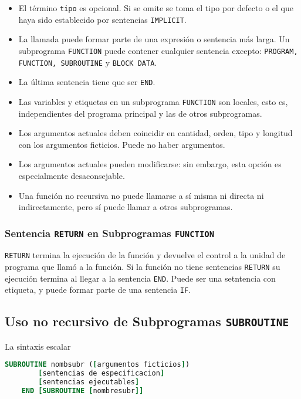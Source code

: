 \begin{itemize}
	\item El término {\tt tipo} es opcional. Si se omite se toma el tipo por defecto o el que haya sido establecido por sentencias {\tt IMPLICIT}. 
	\item La llamada puede formar parte de una expresión o sentencia más larga. Un subprograma {\tt FUNCTION} puede contener cualquier sentencia excepto: {\tt PROGRAM, FUNCTION, SUBROUTINE} y {\tt BLOCK DATA}.
	\item La última sentencia tiene que ser {\tt END}. 
	\item Las variables y etiquetas en un subprograma {\tt FUNCTION} son locales, esto es, independientes del programa principal y las de otros subprogramas. 
	\item Los argumentos actuales deben coincidir en cantidad, orden, tipo y longitud con los argumentos ficticios. Puede no haber argumentos.
	\item Los argumentos actuales pueden modificarse: sin embargo, esta opción es especialmente desaconsejable. 
	\item Una función no recursiva no puede llamarse a sí misma ni directa ni indirectamente, pero sí puede llamar a otros subprogramas.
\end{itemize}

\subsubsection{Sentencia {\tt RETURN} en Subprogramas {\tt FUNCTION}}

{\tt RETURN} termina la ejecución de la función y devuelve el control a la unidad de programa que llamó a la función. Si la función no tiene sentencias {\tt RETURN} su ejecución termina al llegar a la sentencia {\tt END}. Puede ser una setntencia con etiqueta, y puede formar parte de una sentencia {\tt IF}.

\subsection{Uso no recursivo de Subprogramas {\tt SUBROUTINE}}

La sintaxis escalar

\begin{lstlisting}[language=Fortran]
	SUBROUTINE nombsubr ([argumentos ficticios])
		[sentencias de especificacion]
		[sentencias ejecutables]
	END [SUBROUTINE [nombresubr]]
\end{lstlisting}

